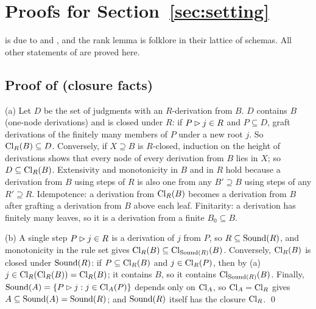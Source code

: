 \providecommand{\vars}{\mathrm{vars}}
\providecommand{\Ttrust}{T_{\mathrm{trust}}}

\section{Proofs for Section~\ref{sec:setting}}\label{app:setting}

 is due to \citet{plotkin1970note} and
\citet{reynolds1970transformational}, and the rank lemma is folklore in their
lattice of schemas. All other statements of  are proved here.

\subsection{Proof of \texorpdfstring{}{the closure lemma} (closure facts)}

(a) Let $D$ be the set of judgments with an $R$-derivation from $B$. $D$ contains
$B$ (one-node derivations) and is closed under $R$: if $P\rhd j\in R$ and
$P\subseteq D$, graft derivations of the finitely many members of $P$ under a new
root $j$. So $\mathrm{Cl}_R(B)\subseteq D$. Conversely, if $X\supseteq B$ is $R$-closed,
induction on the height of derivations shows that every node of every derivation
from $B$ lies in $X$; so $D\subseteq\mathrm{Cl}_R(B)$. Extensivity and monotonicity in
$B$ and in $R$ hold because a derivation from $B$ using steps of $R$ is also one
from any $B'\supseteq B$ using steps of any $R'\supseteq R$. Idempotence: a
derivation from $\mathrm{Cl}_R(B)$ becomes a derivation from $B$ after grafting a
derivation from $B$ above each leaf. Finitarity: a derivation has finitely many
leaves, so it is a derivation from a finite $B_0\subseteq B$.

(b) A single step $P\rhd j\in R$ is a derivation of $j$ from $P$, so
$R\subseteq\mathrm{Sound}(R)$, and monotonicity in the rule set gives
$\mathrm{Cl}_R(B)\subseteq\mathrm{Cl}_{\mathrm{Sound}(R)}(B)$. Conversely, $\mathrm{Cl}_R(B)$ is closed under
$\mathrm{Sound}(R)$: if $P\subseteq\mathrm{Cl}_R(B)$ and $j\in\mathrm{Cl}_R(P)$, then by (a)
$j\in\mathrm{Cl}_R(\mathrm{Cl}_R(B))=\mathrm{Cl}_R(B)$; it contains $B$, so it contains
$\mathrm{Cl}_{\mathrm{Sound}(R)}(B)$. Finally, $\mathrm{Sound}(A)=\{P\rhd j:j\in\mathrm{Cl}_A(P)\}$ depends
only on $\mathrm{Cl}_A$, so $\mathrm{Cl}_A=\mathrm{Cl}_R$ gives $A\subseteq\mathrm{Sound}(A)=\mathrm{Sound}(R)$; and
$\mathrm{Sound}(R)$ itself has the closure $\mathrm{Cl}_R$. \qed

